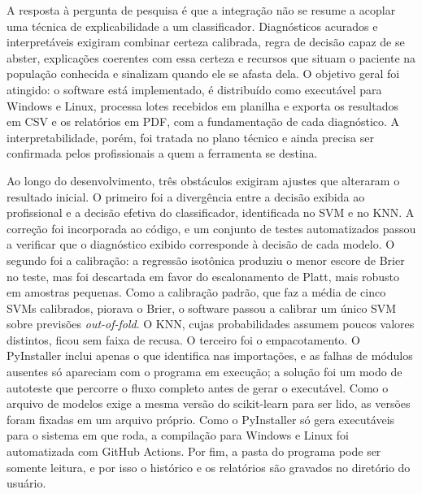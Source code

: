 \documentclass[
    12pt
    ,oneside
    ,a4paper
    ,chapter=TITLE
    ,section=TITLE
    ,sumario=abnt-6027-2012
    ,english,brazil]{abntex2} %
\begin{document}
A resposta à pergunta de pesquisa é que a integração não se resume a acoplar uma técnica de explicabilidade a um classificador. Diagnósticos acurados e interpretáveis exigiram combinar certeza calibrada, regra de decisão capaz de se abster, explicações coerentes com essa certeza e recursos que situam o paciente na população conhecida e sinalizam quando ele se afasta dela. O objetivo geral foi atingido: o software está implementado, é distribuído como executável para Windows e Linux, processa lotes recebidos em planilha e exporta os resultados em CSV e os relatórios em PDF, com a fundamentação de cada diagnóstico. A interpretabilidade, porém, foi tratada no plano técnico e ainda precisa ser confirmada pelos profissionais a quem a ferramenta se destina.

Ao longo do desenvolvimento, três obstáculos exigiram ajustes que alteraram o resultado inicial. O primeiro foi a divergência entre a decisão exibida ao profissional e a decisão efetiva do classificador, identificada no SVM e no KNN. A correção foi incorporada ao código, e um conjunto de testes automatizados passou a verificar que o diagnóstico exibido corresponde à decisão de cada modelo. O segundo foi a calibração: a regressão isotônica produziu o menor escore de Brier no teste, mas foi descartada em favor do escalonamento de Platt, mais robusto em amostras pequenas. Como a calibração padrão, que faz a média de cinco SVMs calibrados, piorava o Brier, o software passou a calibrar um único SVM sobre previsões \textit{out-of-fold}. O KNN, cujas probabilidades assumem poucos valores distintos, ficou sem faixa de recusa. O terceiro foi o empacotamento. O PyInstaller inclui apenas o que identifica nas importações, e as falhas de módulos ausentes só apareciam com o programa em execução; a solução foi um modo de autoteste que percorre o fluxo completo antes de gerar o executável. Como o arquivo de modelos exige a mesma versão do scikit-learn para ser lido, as versões foram fixadas em um arquivo próprio. Como o PyInstaller só gera executáveis para o sistema em que roda, a compilação para Windows e Linux foi automatizada com GitHub Actions. Por fim, a pasta do programa pode ser somente leitura, e por isso o histórico e os relatórios são gravados no diretório do usuário.
\end{document}

